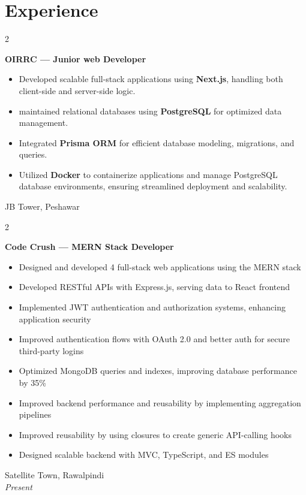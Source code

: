 \documentclass[10pt, letterpaper]{article}
\newenvironment{highlights}{
    \begin{itemize}[
        topsep=0.10 cm,
        parsep=0.10 cm,
        partopsep=0pt,
        itemsep=0pt,
        leftmargin=0.4 cm + 10pt
    ]
}{
    \end{itemize}
}
\newenvironment{twocolentry}[2][]{
    \onecolentry
    \def\secondColumn{#2}
    \setcolumnwidth{\fill, 4.5 cm}
    \begin{paracol}{2}
}{
    \switchcolumn \raggedleft \secondColumn
    \end{paracol}
    \endonecolentry
}
\begin{document}
\section{Experience}

\begin{twocolentry}{
		JB Tower, Peshawar \\
	}
	\textbf{OIRRC — Junior web Developer}
	\begin{highlights}
		\item Developed scalable full-stack applications using \textbf{Next.js}, handling both client-side and server-side logic.
		\item maintained relational databases using \textbf{PostgreSQL} for optimized data management.
		\item Integrated \textbf{Prisma ORM} for efficient database modeling, migrations, and queries.
		\item Utilized \textbf{Docker} to containerize applications and manage PostgreSQL database environments, ensuring streamlined deployment and scalability.
	\end{highlights}
\end{twocolentry}

\begin{twocolentry}{
		Satellite Town, Rawalpindi\\
		\textit{Present}
	}
	\textbf{Code Crush — MERN Stack Developer}
	\begin{highlights}
		\item Designed and developed 4 full-stack web applications using the MERN stack
		\item Developed RESTful APIs with Express.js, serving data to React frontend
		\item Implemented JWT authentication and authorization systems, enhancing application security
		\item Improved authentication flows with OAuth 2.0 and better auth for secure third-party logins
		\item Optimized MongoDB queries and indexes, improving database performance by 35\%
		\item Improved backend performance and reusability by implementing aggregation pipelines
		\item Improved reusability by using closures to create generic API-calling hooks
		\item Designed scalable backend with MVC, TypeScript, and ES modules
	\end{highlights}
\end{twocolentry}
\end{document}
